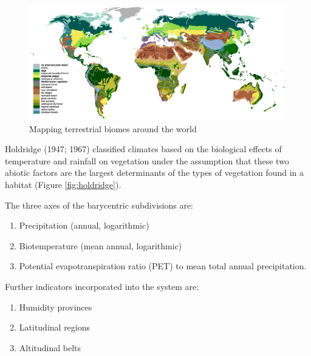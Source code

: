 \documentclass[]{book}
\providecommand{\tightlist}{%
  \setlength{\itemsep}{0pt}\setlength{\parskip}{0pt}}
\begin{document}
\begin{figure}

{\centering \includegraphics[width=1\linewidth]{figures/biomes} 

}

\caption{Mapping terrestrial biomes around the world}\label{fig:biomes}
\end{figure}

Holdridge (1947; 1967) classified climates based on the biological
effects of temperature and rainfall on vegetation under the assumption
that these two abiotic factors are the largest determinants of the types
of vegetation found in a habitat (Figure \ref{fig:holdridge}).

The three axes of the barycentric subdivisions are:

\begin{enumerate}
\def\labelenumi{\arabic{enumi}.}
\tightlist
\item
  Precipitation (annual, logarithmic)
\item
  Biotemperature (mean annual, logarithmic)
\item
  Potential evapotranspiration ratio (PET) to mean total annual
  precipitation.
\end{enumerate}

Further indicators incorporated into the system are:

\begin{enumerate}
\def\labelenumi{\arabic{enumi}.}
\tightlist
\item
  Humidity provinces
\item
  Latitudinal regions
\item
  Altitudinal belts
\end{enumerate}
\end{document}
